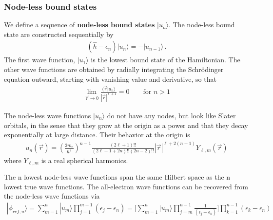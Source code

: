 \documentclass[11pt,a4paper]{report}
\begin{document}
\subsubsection{Node-less bound states}
We define\cite{bloechl12_arxiv1210_5937} a sequence of
\textbf{node-less bound states}
$|u_n\rangle$. The node-less bound state are constructed sequentially
by
\begin{eqnarray}
(\hat{h}-\epsilon_n)|u_n\rangle=-|u_{n-1}\rangle
\,.
\label{eq:nodelesseq}
\end{eqnarray}
The first wave function, $|u_1\rangle$ is the lowest bound state of
the Hamiltonian. The other wave functions are obtained by radially
integrating the Schr\"odinger equation outward, starting with
vanishing value and derivative, so that
\begin{eqnarray}
\lim_{\vec{r}\rightarrow0}\frac{\langle\vec{r}|u_n\rangle}{|\vec{r}|^{\ell+1}}=0
\qquad\text{for $n>1$}
\end{eqnarray}


The node-less wave functions $|u_n\rangle$ do not have any nodes, but
look like Slater orbitals, in the sense that they grow at the origin
as a power and that they decay exponentially at large distance. Their
behavior at the origin is\cite{bloechl12_arxiv1210_5937}
\begin{eqnarray}
u_{n}(\vec{r})
=\left(\frac{2m_e}{\hbar^2}\right)^{n-1}
\frac{(2\ell+1)!!}{(2\ell-1+2n)!!(2n-2)!!}
|\vec{r}|^{\ell+2(n-1)}Y_{\ell,m}(\vec{r})
\end{eqnarray}
where $Y_{\ell,m}$ is a real spherical harmonics.

The n lowest node-less wave functions span the same Hilbert space as
the n lowest true wave functions. The all-electron wave functions can
be recovered from the node-less wave functions
via\cite{bloechl12_arxiv1210_5937}
\begin{eqnarray}
|\phi_{ref,n}\rangle=\sum_{m=1}^n|u_m\rangle \prod_{j=1}^{m-1}(\epsilon_j-\epsilon_n)
=\biggl[\sum_{m=1}^n|u_m\rangle 
\prod_{j=m}^{n-1}\frac{1}{(\epsilon_j-\epsilon_n)}
\biggr]\prod_{k=1}^{n-1}(\epsilon_k-\epsilon_n)
\end{eqnarray}

\end{document}
